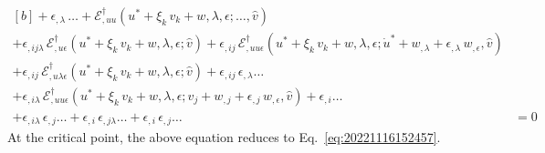 \documentclass[12pt, final]{scrartcl}
\theoremstyle{definition}
\newcommand{\E}{\mathcal E}
\newcommand{\EE}{\mathcal E ^ \dagger}
\begin{document}
\begin{equation}
\begin{aligned}[b]
    + \epsilon_{,\lambda} \, \ldots + \EE_{,uu}(u^\ast + \xi_k \, v_k + w, \lambda, \epsilon; \ldots, \hat{v}) &\\
    + \epsilon_{,ij\lambda} \, \EE_{,u\epsilon}(u^\ast + \xi_k \, v_k + w, \lambda, \epsilon; \hat{v}) + \epsilon_{,ij} \, \EE_{,uu\epsilon}(u^\ast + \xi_k \, v_k + w, \lambda, \epsilon; \dot{u}^\ast + w_{,\lambda} + \epsilon_{,\lambda} \, w_{,\epsilon}, \hat{v}) &\\
    + \epsilon_{,ij} \, \EE_{,u\lambda\epsilon}(u^\ast + \xi_k \, v_k + w, \lambda, \epsilon; \hat{v}) + \epsilon_{,ij} \, \epsilon_{,\lambda} \ldots &\\
    + \epsilon_{,i\lambda} \, \EE_{,uu\epsilon}(u^\ast + \xi_k \, v_k + w, \lambda, \epsilon; v_j + w_{,j} + \epsilon_{,j} \, w_{,\epsilon}, \hat{v}) + \epsilon_{,i} \ldots &\\
    + \epsilon_{,i\lambda} \, \epsilon_{,j} \ldots + \epsilon_{,i} \, \epsilon_{,j\lambda} \ldots + \epsilon_{,i} \, \epsilon_{,j} \ldots &= 0
  \end{aligned}
\end{equation}
At the critical point, the above equation reduces to Eq.~\eqref{eq:20221116152457}.
\end{document}
